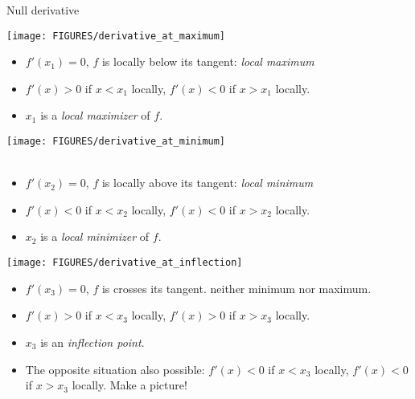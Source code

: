 \documentclass[8pt,dvipsnames]{beamer}
\begin{document}
\begin{frame}{Null derivative}
  \begin{overprint}
    \begin{center}
      \texttt{[image: FIGURES/derivative\_at\_maximum]}
    \end{center}
    \begin{itemize}
      \item $f'(x_1) =0$, $f$ is locally below its tangent: \emph{local maximum}
      \item $f'(x) > 0$ if $x < x_1$ locally, $f'(x) < 0$ if $x>x_1$ locally.
      \item $x_1$ is a \emph{local maximizer} of $f$.
    \end{itemize}
    \begin{center}
      \texttt{[image: FIGURES/derivative\_at\_minimum]}\\~\\
    \end{center}
    \begin{itemize}
      \item $f'(x_2) =0$, $f$ is locally above its tangent: \emph{local minimum}
      \item $f'(x) < 0$ if $x < x_2$ locally, $f'(x) < 0$ if $x>x_2$ locally.
      \item $x_2$ is a \emph{local minimizer} of $f$.
    \end{itemize}
    \begin{center}
      \texttt{[image: FIGURES/derivative\_at\_inflection]}
    \end{center}
  \begin{itemize}
    \item $f'(x_3) =0$, $f$ is crosses its tangent. neither minimum nor maximum.
    \item $f'(x) > 0$ if $x < x_3$ locally, $f'(x) > 0$ if $x>x_3$ locally.
    \item $x_3$ is an \emph{inflection point}.
    \item The opposite situation also possible: $f'(x) < 0$ if $x < x_3$ locally, $f'(x) < 0$ if $x>x_3$ locally. Make a picture!
     
  \end{itemize}
  \end{overprint}
\end{frame}
\end{document}
